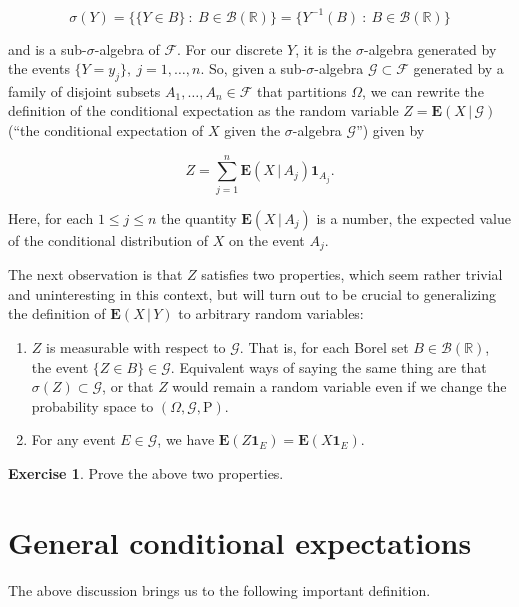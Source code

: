 \documentclass[11pt]{report}
\newcommand{\R}{\mathbb{R}}
\theoremstyle{plain}
\theoremstyle{definition}
\newtheorem{xexercise}[thm]{Exercise}
\begin{document}
\[
\sigma(Y) = \big\{ \{Y \in B\}\ :\ B\in\mathcal{B}(\R) \big\}
= \{ Y^{-1}(B)\ :\ B\in\mathcal{B}(\R) \}
\]

\noindent and is a sub-$\sigma$-algebra of $\mathcal{F}$. For
our discrete $Y$, it is the $\sigma$-algebra
generated by the events $\{Y=y_j\}, \ j=1,\ldots,n$.
So, given a sub-$\sigma$-algebra
$\mathcal{G} \subset \mathcal{F}$ generated by a
family of disjoint subsets
$A_1,\ldots,A_n \in \mathcal{F}$ that partitions
$\Omega$, we can rewrite the definition of the
conditional expectation as the random variable
$Z = \mathbf{E}\left(X\,|\,\mathcal{G}\right)$ (``the
conditional expectation of $X$ given the
$\sigma$-algebra $\mathcal{G}$'') given by

\[
Z = \sum_{j=1}^n \mathbf{E}\left(X\,|\,A_j\right) \mathbf{1}_{A_j}.
\]

\noindent Here, for each $1\le j\le n$ the quantity
$\mathbf{E}\left(X\,|\,A_j\right)$ is a number, the
expected value of the conditional distribution of $X$
on the event $A_j$.

The next observation is that $Z$ satisfies two
properties, which seem rather trivial and
uninteresting in this context, but will turn out to be
crucial to generalizing the definition of
$\mathbf{E}\left(X\,|\,Y\right)$ to arbitrary random
variables:

\begin{enumerate}[label=(\roman*)]
\item $Z$ is measurable with respect to $\mathcal{G}$. That
is, for each Borel set $B\in \mathcal{B}(\R)$, the
event $\{Z\in B\} \in \mathcal{G}$. Equivalent ways
of saying the same thing are that
$\sigma(Z)\subset \mathcal{G}$, or that $Z$ would
remain a random variable even if we change the
probability space to
$(\Omega,\mathcal{G},\mathrm{P})$.

\item For any event $E \in \mathcal{G}$, we have
$\mathbf{E}(Z \mathbf{1}_E) = \mathbf{E}(X
\mathbf{1}_E)$.
\end{enumerate}

\begin{xexercise}
Prove the above two properties.
\end{xexercise}

\section{General conditional expectations}

The above discussion brings us to the following
important definition.
\end{document}
